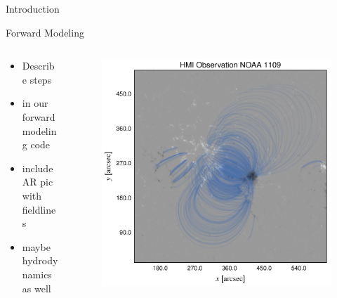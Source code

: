 \documentclass[final]{beamer}
\begin{document}
\begin{frame}
\begin{columns}[T]
\begin{column}{0.49\linewidth}
\begin{block}{Introduction}
\begin{itemize}
\begin{itemize}
      \end{itemize}
    \end{itemize}
    \end{block}
    \begin{block}{Forward Modeling}
      \begin{columns}[T]
      \begin{column}{0.49\columnwidth}
        \begin{itemize}
        \item Describe steps
        \item in our forward modeling code
        \item include AR pic with fieldlines
        \item maybe hydrodynamics as well
        \end{itemize}
      \end{column}
      \begin{column}{0.49\columnwidth}
        \begin{figure}
        \includegraphics[width=\columnwidth]{figures/hmi_map_with_lines.pdf}
        \end{figure}
      \end{column}
      \end{columns}
    \end{block}

\end{column}
\end{columns}
\end{frame}
\end{document}
